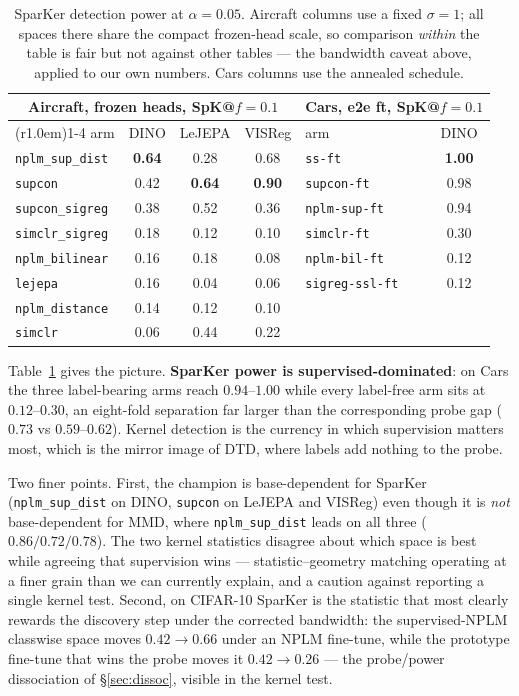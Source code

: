 \documentclass{article}
\newcommand{\best}[1]{\textbf{#1}}
\begin{document}
\begin{table}[t]\centering\small
\begin{tabular}{lccc@{\hskip 1.2em}lc}
\toprule
\multicolumn{4}{c}{\textbf{Aircraft}, frozen heads, SpK@$f{=}0.1$}
& \multicolumn{2}{c}{\textbf{Cars}, e2e ft, SpK@$f{=}0.1$}\\
\cmidrule(r{1.0em}){1-4}\cmidrule{5-6}
arm & DINO & LeJEPA & VISReg & arm & DINO \\
\midrule
\texttt{nplm\_sup\_dist} & \best{0.64} & 0.28 & 0.68 & \texttt{ss-ft}      & \best{1.00} \\
\texttt{supcon}          & 0.42 & \best{0.64} & \best{0.90} & \texttt{supcon-ft}  & 0.98 \\
\texttt{supcon\_sigreg}  & 0.38 & 0.52 & 0.36 & \texttt{nplm-sup-ft}& 0.94 \\
\texttt{simclr\_sigreg}  & 0.18 & 0.12 & 0.10 & \texttt{simclr-ft}  & 0.30 \\
\texttt{nplm\_bilinear}  & 0.16 & 0.18 & 0.08 & \texttt{nplm-bil-ft}& 0.12 \\
\texttt{lejepa}          & 0.16 & 0.04 & 0.06 & \texttt{sigreg-ssl-ft}& 0.12 \\
\texttt{nplm\_distance}  & 0.14 & 0.12 & 0.10 & & \\
\texttt{simclr}          & 0.06 & 0.44 & 0.22 & & \\
\bottomrule
\end{tabular}
\caption{SparKer detection power at $\alpha=0.05$. Aircraft columns use a
fixed $\sigma=1$; all spaces there share the compact frozen-head scale, so
comparison \emph{within} the table is fair but not against other tables ---
the bandwidth caveat above, applied to our own numbers. Cars columns use the
annealed schedule.}
\label{tab:sparker}
\end{table}

Table~\ref{tab:sparker} gives the picture. \textbf{SparKer power is
supervised-dominated}: on Cars the three label-bearing arms reach
$0.94$--$1.00$ while every label-free arm sits at $0.12$--$0.30$, an
eight-fold separation far larger than the corresponding probe gap
($0.73$ vs $0.59$--$0.62$). Kernel detection is the currency in which
supervision matters most, which is the mirror image of DTD, where labels add
nothing to the probe.

Two finer points. First, the champion is base-dependent for SparKer
(\texttt{nplm\_sup\_dist} on DINO, \texttt{supcon} on LeJEPA and VISReg) even
though it is \emph{not} base-dependent for MMD, where \texttt{nplm\_sup\_dist}
leads on all three ($0.86/0.72/0.78$). The two kernel statistics disagree about
which space is best while agreeing that supervision wins --- statistic--geometry
matching operating at a finer grain than we can currently explain, and a caution
against reporting a single kernel test. Second, on CIFAR-10 SparKer is the
statistic that most clearly rewards the discovery step under the corrected
bandwidth: the supervised-NPLM classwise space moves $0.42\to0.66$ under an
NPLM fine-tune, while the prototype fine-tune that wins the probe moves it
$0.42\to0.26$ --- the probe/power dissociation of \S\ref{sec:dissoc}, visible in
the kernel test.
\end{document}
